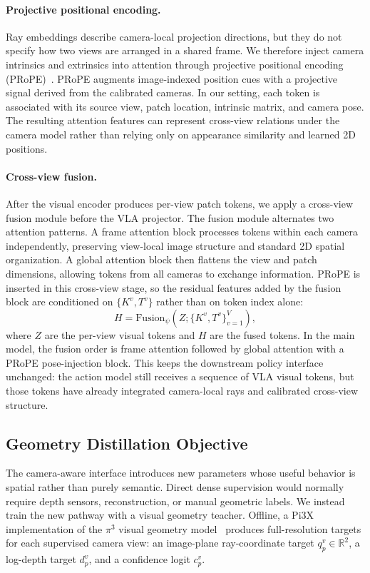 \documentclass{article}
\begin{document}
\paragraph{Projective positional encoding.}
Ray embeddings describe camera-local projection directions, but they do not specify how two views are arranged in a shared frame. We therefore inject camera intrinsics and extrinsics into attention through projective positional encoding (PRoPE)~\citep{li2025cameras}. PRoPE augments image-indexed position cues with a projective signal derived from the calibrated cameras. In our setting, each token is associated with its source view, patch location, intrinsic matrix, and camera pose. The resulting attention features can represent cross-view relations under the camera model rather than relying only on appearance similarity and learned 2D positions.

\paragraph{Cross-view fusion.}
After the visual encoder produces per-view patch tokens, we apply a cross-view fusion module before the VLA projector. The fusion module alternates two attention patterns. A frame attention block processes tokens within each camera independently, preserving view-local image structure and standard 2D spatial organization. A global attention block then flattens the view and patch dimensions, allowing tokens from all cameras to exchange information. PRoPE is inserted in this cross-view stage, so the residual features added by the fusion block are conditioned on $\{K^v,T^v\}$ rather than on token index alone:
\begin{equation}
    H = \mathrm{Fusion}_{\psi}\left(Z;\{K^v,T^v\}_{v=1}^{V}\right),
\end{equation}
where $Z$ are the per-view visual tokens and $H$ are the fused tokens. In the main model, the fusion order is frame attention followed by global attention with a PRoPE pose-injection block. This keeps the downstream policy interface unchanged: the action model still receives a sequence of VLA visual tokens, but those tokens have already integrated camera-local rays and calibrated cross-view structure.

\subsection{Geometry Distillation Objective}
The camera-aware interface introduces new parameters whose useful behavior is spatial rather than purely semantic. Direct dense supervision would normally require depth sensors, reconstruction, or manual geometric labels. We instead train the new pathway with a visual geometry teacher. Offline, a Pi3X implementation of the $\pi^3$ visual geometry model~\citep{wang2025pi3} produces full-resolution targets for each supervised camera view: an image-plane ray-coordinate target $q_p^v\in\mathbb{R}^{2}$, a log-depth target $d_p^v$, and a confidence logit $c_p^v$.
\end{document}

